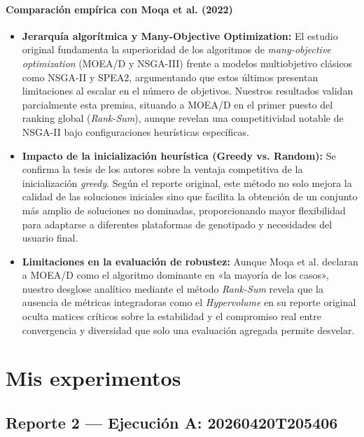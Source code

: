 \documentclass[a4paper,10pt]{article} %
\begin{document}
\paragraph{Comparación empírica con Moqa et al. (2022)}
\begin{itemize}
    \item \textbf{Jerarquía algorítmica y Many-Objective Optimization:} El estudio original fundamenta la superioridad de los algoritmos de \textit{many-objective optimization} (MOEA/D y NSGA-III) frente a modelos multiobjetivo clásicos como NSGA-II y SPEA2, argumentando que estos últimos presentan limitaciones al escalar en el número de objetivos. Nuestros resultados validan parcialmente esta premisa, situando a MOEA/D en el primer puesto del ranking global (\textit{Rank-Sum}), aunque revelan una competitividad notable de NSGA-II bajo configuraciones heurísticas específicas.
    \item \textbf{Impacto de la inicialización heurística (Greedy vs. Random):} Se confirma la tesis de los autores sobre la ventaja competitiva de la inicialización \textit{greedy}. Según el reporte original, este método no solo mejora la calidad de las soluciones iniciales sino que facilita la obtención de un conjunto más amplio de soluciones no dominadas, proporcionando mayor flexibilidad para adaptarse a diferentes plataformas de genotipado y necesidades del usuario final.
    \item \textbf{Limitaciones en la evaluación de robustez:} Aunque Moqa et al. declaran a MOEA/D como el algoritmo dominante en «la mayoría de los casos», nuestro desglose analítico mediante el método \textit{Rank-Sum} revela que la ausencia de métricas integradoras como el \textit{Hypervolume} en su reporte original oculta matices críticos sobre la estabilidad y el compromiso real entre convergencia y diversidad que solo una evaluación agregada permite desvelar.
\end{itemize}


\section{Mis experimentos}
\label{sec:mis_experimentos}

\subsection{Reporte 2 — Ejecución A: 20260420T205406}
\label{sec:reporte2}
\end{document}
